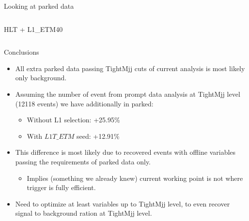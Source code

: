 \documentclass[8pt]{beamer}
\begin{document}
\begin{frame}{Looking at parked data}
\begin{columns}
\begin{block}{HLT + L1\_ETM40}

\end{block}
 
\end{columns}

\end{frame}

\begin{frame}{Conclusions}

\begin{block}

\begin{itemize}
  \item All extra parked data passing TightMjj cuts of current analysis is most likely only background.
  \item Assuming the number of event from prompt data analysis at TightMjj level (12118 events) we have additionally in parked:
  \begin{itemize}
    \item Without L1 selection: +25.95\%
    \item With $L1T\_ETM$ seed: +12.91\%
  \end{itemize}
  \item This difference is most likely due to recovered events with offline variables passing the requirements of parked data only. 
  \begin{itemize}
    \item Implies (something we already knew) current working point is not where trigger is fully efficient.
  \end{itemize}
  \item Need to optimize at least variables up to TightMjj level, to even recover signal to background ration at TightMjj level.
\end{itemize} 

\end{block}

\end{frame}
\end{document}
